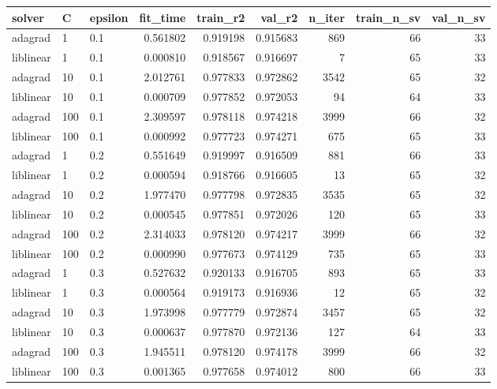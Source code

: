 \begin{tabular}{lllrrrrrr}
\toprule
   solver &   C & epsilon &  fit\_time &  train\_r2 &   val\_r2 &  n\_iter &  train\_n\_sv &  val\_n\_sv \\
\midrule
  adagrad &   1 &     0.1 &  0.561802 &  0.919198 & 0.915683 &     869 &          66 &        33 \\
liblinear &   1 &     0.1 &  0.000810 &  0.918567 & 0.916697 &       7 &          65 &        33 \\
  adagrad &  10 &     0.1 &  2.012761 &  0.977833 & 0.972862 &    3542 &          65 &        32 \\
liblinear &  10 &     0.1 &  0.000709 &  0.977852 & 0.972053 &      94 &          64 &        33 \\
  adagrad & 100 &     0.1 &  2.309597 &  0.978118 & 0.974218 &    3999 &          66 &        32 \\
liblinear & 100 &     0.1 &  0.000992 &  0.977723 & 0.974271 &     675 &          65 &        33 \\
  adagrad &   1 &     0.2 &  0.551649 &  0.919997 & 0.916509 &     881 &          66 &        33 \\
liblinear &   1 &     0.2 &  0.000594 &  0.918766 & 0.916605 &      13 &          65 &        32 \\
  adagrad &  10 &     0.2 &  1.977470 &  0.977798 & 0.972835 &    3535 &          65 &        32 \\
liblinear &  10 &     0.2 &  0.000545 &  0.977851 & 0.972026 &     120 &          65 &        33 \\
  adagrad & 100 &     0.2 &  2.314033 &  0.978120 & 0.974217 &    3999 &          66 &        32 \\
liblinear & 100 &     0.2 &  0.000990 &  0.977673 & 0.974129 &     735 &          65 &        33 \\
  adagrad &   1 &     0.3 &  0.527632 &  0.920133 & 0.916705 &     893 &          65 &        33 \\
liblinear &   1 &     0.3 &  0.000564 &  0.919173 & 0.916936 &      12 &          65 &        32 \\
  adagrad &  10 &     0.3 &  1.973998 &  0.977779 & 0.972874 &    3457 &          65 &        32 \\
liblinear &  10 &     0.3 &  0.000637 &  0.977870 & 0.972136 &     127 &          64 &        33 \\
  adagrad & 100 &     0.3 &  1.945511 &  0.978120 & 0.974178 &    3999 &          66 &        32 \\
liblinear & 100 &     0.3 &  0.001365 &  0.977658 & 0.974012 &     800 &          66 &        33 \\
\bottomrule
\end{tabular}
